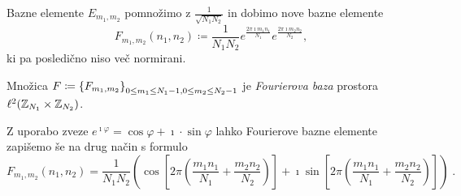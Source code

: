 %
Bazne elemente $E_{m_1, m_2}$ pomnožimo z $\frac{1}{\sqrt{N_1N_2}}$ in dobimo nove bazne elemente
$$F_{m_1, m_2}(n_1, n_2) \coloneqq \frac{1}{N_1N_2} e^{\frac{2\pi \imath m_1n_1}{N_1}} e^{\frac{2\pi \imath m_2n_2}{N_2}},$$
ki pa posledično niso več normirani.
%
\begin{definicija}
Množica $F \coloneqq \left\{F_{m_1, m_2}\right\}_{0 \leq m_1 \leq N_1 - 1, 0 \leq m_2 \leq N_2 - 1}$ je \emph{Fourierova baza} prostora $\ell^2(\mathbb Z_{N_1} \times \mathbb Z_{N_2})$.
\end{definicija}
%
Z uporabo zveze $e^{\imath \varphi} = \cos \varphi + \imath \cdot \sin \varphi$ lahko Fourierove bazne elemente zapišemo še na drug način s formulo
$$F_{m_1, m_2}(n_1, n_2) = \frac{1}{N_1N_2} \left(\cos\left[2\pi \left(\frac{m_1 n_1}{N_1} + \frac{m_2 n_2}{N_2}\right)\right] + \imath \sin\left[2\pi \left(\frac{m_1 n_1}{N_1} + \frac{m_2 n_2}{N_2}\right)\right] \right) \;.$$
%
